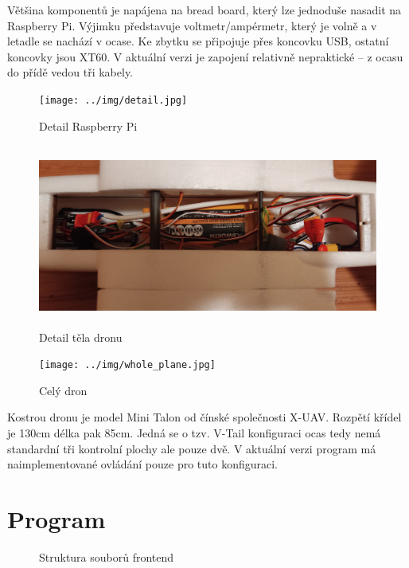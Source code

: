 \documentclass[a4paper,oneside,12pt]{report}
\begin{document}
Většina komponentů je napájena na bread board, který lze jednoduše nasadit na Raspberry Pi.
Výjimku představuje voltmetr/ampérmetr, který je volně a v letadle se nachází v ocase.
Ke zbytku se připojuje přes koncovku USB, ostatní koncovky jsou XT60.
V aktuální verzi je zapojení relativně nepraktické -- z ocasu do přídě vedou tři kabely.

\begin{figure}[h]
  \centering
  \texttt{[image: ../img/detail.jpg]}
  \caption[Detail Raspberry Pi]{Detail Raspberry Pi}
\end{figure}


\newpage

\begin{figure}[h]
  \centering
  \includegraphics[height=6cm]{../img/body.jpg}
  \caption[Detail těla dronu]{Detail těla dronu}
\end{figure}

\begin{figure}[h]
  \centering
  \texttt{[image: ../img/whole\_plane.jpg]}
  \caption[Celý dron]{Celý dron}
\end{figure}


Kostrou dronu je model Mini Talon od čínské společnosti X-UAV.
Rozpětí křídel je 130cm délka pak 85cm.
Jedná se o tzv. V-Tail konfiguraci ocas tedy nemá standardní tři kontrolní plochy ale pouze dvě.
V aktuální verzi program má naimplementované ovládání pouze pro tuto konfiguraci.

\newpage

\section{Program}

\begin{figure}[h]
  \caption[Struktura souborů na dronu, vlastní tvorba]{Struktura souborů frontend}
\end{figure}
\end{document}
